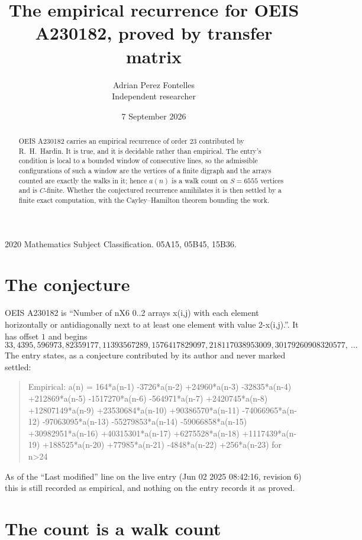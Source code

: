 \documentclass[11pt,a4paper]{article}
\title{The empirical recurrence for OEIS A230182, proved by transfer matrix}
\author{Adrian Perez Fontelles\\ \small Independent researcher}
\date{7 September 2026}
\theoremstyle{plain}
\theoremstyle{definition}
\begin{document}
\maketitle

\begin{abstract}
OEIS A230182 carries an empirical recurrence of order $23$ contributed by R.~H.~Hardin. It is
true, and it is decidable rather than empirical. The entry's condition is local to a bounded window of consecutive lines, so
the admissible configurations of such a window are the vertices of a finite digraph and the
arrays counted are exactly the walks in it; hence $a(n)$ is a walk count on $S=6555$ vertices
and is $C$-finite. Whether the conjectured recurrence annihilates it is then settled by a
finite exact computation, with the Cayley--Hamilton theorem bounding the work.
\end{abstract}

\noindent\small 2020 Mathematics Subject Classification. 05A15, 05B45, 15B36.\normalsize

\section{The conjecture}

OEIS A230182 is ``Number of nX6 0..2 arrays x(i,j) with each element horizontally or antidiagonally next to at least one element with value 2-x(i,j).''. It has offset $1$ and begins
\[
33, 4395, 596973, 82359177, 11393567289, 1576417829097, 218117038953009, 30179260908320577,\ \dots
\]
The entry states, as a conjecture contributed by its author and never marked settled:
\begin{quote}
Empirical: a(n) = 164*a(n-1) -3726*a(n-2) +24960*a(n-3) -32835*a(n-4) +212869*a(n-5) -1517270*a(n-6) -564971*a(n-7) +2420745*a(n-8) +12807149*a(n-9) +23530684*a(n-10) +90386570*a(n-11) -74066965*a(n-12) -97063095*a(n-13) -55279853*a(n-14) -59066858*a(n-15) +30982951*a(n-16) +40315301*a(n-17) +6275528*a(n-18) +1117439*a(n-19) +188525*a(n-20) +77985*a(n-21) -4848*a(n-22) +256*a(n-23) for n>24
\end{quote}
As of the ``Last modified'' line on the live entry (Jun 02 2025 08:42:16, revision 6) this is still
recorded as empirical, and nothing on the entry records it as proved.

\section{The count is a walk count}
\end{document}
